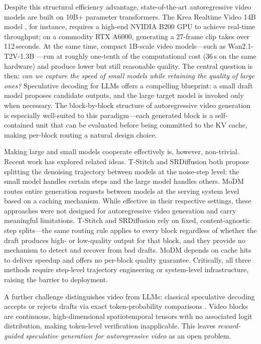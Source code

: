 \documentclass{article}
\begin{document}
Despite this structural efficiency advantage, state-of-the-art
autoregressive video models are built on 10B+ parameter transformers.
The Krea Realtime Video 14B model \citep{kreablog2025}, for instance,
requires a high-end NVIDIA B200 GPU to achieve real-time throughput;
on a commodity RTX A6000, generating a 27-frame clip takes over
112\,seconds.
At the same time, compact 1B-scale video models---such as
Wan2.1-T2V-1.3B \citep{wan2025}---run at roughly one-tenth of the
computational cost (36\,s on the same hardware) and produce lower but
still reasonable quality.
The central question is then: \emph{can we capture the speed of small
models while retaining the quality of large ones?}
Speculative decoding for LLMs \citep{leviathan2023fast,chen2023accelerating}
offers a compelling blueprint: a small draft model proposes candidate
outputs, and the large target model is invoked only when necessary.
The block-by-block structure of autoregressive video generation is
especially well-suited to this paradigm---each generated block is a
self-contained unit that can be evaluated before being committed to the
KV cache, making per-block routing a natural design choice.

Making large and small models cooperate effectively is, however,
non-trivial.
Recent work has explored related ideas.
T-Stitch \citep{tstitch2024} and SRDiffusion \citep{srdiffusion2025}
both propose splitting the denoising trajectory between models at the
noise-step level: the small model handles certain steps and the large
model handles others.
MoDM \citep{modm2025} routes entire generation requests between models
at the serving system level based on a caching mechanism.
While effective in their respective settings, these approaches were not
designed for autoregressive video generation and carry meaningful
limitations.
T-Stitch and SRDiffusion rely on fixed, content-agnostic step splits---the
same routing rule applies to every block regardless of whether the draft
produces high- or low-quality output for that block, and they provide
no mechanism to detect and recover from bad drafts.
MoDM depends on cache hits to deliver speedup and offers no per-block
quality guarantee.
Critically, all three methods require step-level trajectory engineering or
system-level infrastructure, raising the barrier to deployment.

A further challenge distinguishes video from LLMs: classical speculative
decoding accepts or rejects drafts via exact token-probability comparisons
\citep{leviathan2023fast}.
Video blocks are continuous, high-dimensional spatiotemporal tensors with
no associated logit distribution, making token-level verification
inapplicable.
This leaves \emph{reward-guided speculative generation for autoregressive
video} as an open problem.
\end{document}
